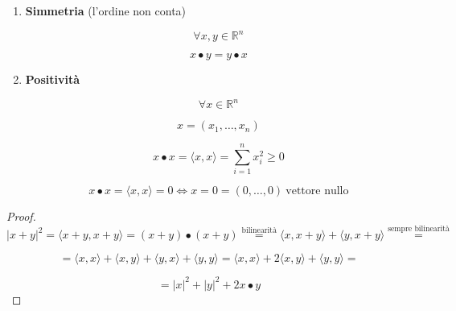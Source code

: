 \documentclass[../appunti-analisi.tex]{subfiles}
\begin{document}
\begin{itemize}
\begin{enumerate}
            \item \textbf{Simmetria} (l'ordine non conta)

                \[
                    \forall x,y \in \mathbb{R}^{n}
                \]

                \[
                    x \bullet y = y \bullet x
                \]

            \item \textbf{Positività} 
                
                \[
                    \forall x \in  \mathbb{R}^{n}
                \]

                \[
                    x=(x_1, \ldots ,x_n)
                \]

                \[
                    x \bullet x = \langle x,x \rangle = \sum^{n}_{i=1} x_i^{2}\ge 0
                \]

                \[
                    x \bullet x = \langle x,x \rangle = 0 \Leftrightarrow x = 0 = (0, \ldots ,0)\ \text{vettore nullo}
                \]

        \end{enumerate}



           
\end{itemize}

\newpage


\begin{proof}
       \[
           |x+ y| ^{2} = \langle x+y , x+y \rangle = (x+y) \bullet (x+y) \overset{\text{bilinearità}}{=} \langle x,x+y \rangle + \langle y,x+y \rangle \overset{\text{sempre bilinearità}}{=} 
       \]    

       \[
           =\langle x,x \rangle + \langle x,y \rangle + \langle y,x \rangle + \langle y,y \rangle = \langle x,x \rangle + 2\langle x,y \rangle + \langle y,y \rangle= 
       \]

       \[
            = |x|^{2} + |y|^{2} + 2x \bullet y
       \]
\end{proof}
\end{document}

